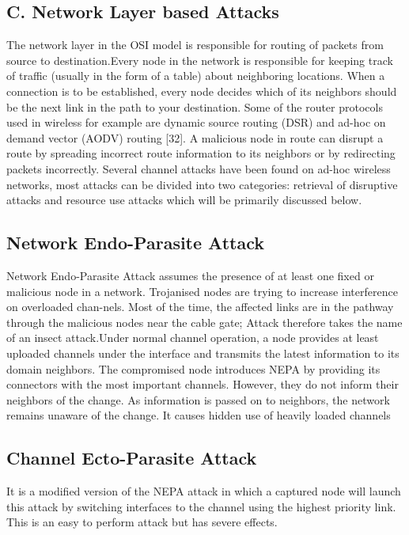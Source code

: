 \documentclass{article}
\begin{document}
\newline

\subsection{C. Network Layer based Attacks}
The network layer in the OSI model is responsible for
routing of packets from source to destination.Every node in
the network is responsible for keeping track of traffic
(usually in the form of a table) about neighboring locations.
When a connection is to be established, every node decides
which of its neighbors should be the next link in the path to
your destination. Some of the router protocols used in
wireless for example are dynamic source routing (DSR) and
ad-hoc on demand vector (AODV) routing [32]. A
malicious node in route can disrupt a route by spreading
incorrect route information to its neighbors or by redirecting
packets incorrectly. Several channel attacks have been
found on ad-hoc wireless networks, most attacks can be
divided into two categories: retrieval of disruptive attacks
and resource use attacks which will be primarily discussed
below.
\newline

\subsection{Network Endo-Parasite Attack}
Network Endo-Parasite Attack assumes the presence of at
least one fixed or malicious node in a network. Trojanised
nodes are trying to increase interference on overloaded
chan-nels. Most of the time, the affected links are in the
pathway through the malicious nodes near the cable gate;
Attack therefore takes the name of an insect attack.Under
normal channel operation, a node provides at least uploaded
channels under the interface and transmits the latest
information to its domain neighbors. The compromised
node introduces NEPA by providing its connectors with the
most important channels. However, they do not inform their
neighbors of the change. As information is passed on to
neighbors, the network remains unaware of the change. It
causes hidden use of heavily loaded channels
\newline

\subsection{Channel Ecto-Parasite Attack}
It is a modified version of the NEPA attack in which a
captured node will launch this attack by switching interfaces
to the channel using the highest priority link. This is an easy
to perform attack but has severe effects.
\newline
\end{document}
